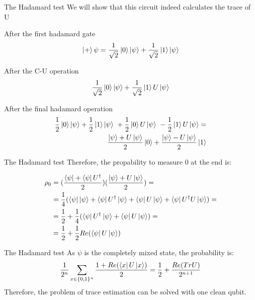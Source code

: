\documentclass[leqno,fleqn]{beamer}
\begin{document}
\begin{frame}[label=sec-1-4]{The Hadamard test}
We will show that this circuit indeed calculates the trace of U
\begin{block}{After the first hadamard gate}
\begin{align*}
   \Ket{+}\psi = \frac{1}{\sqrt{2}}\Ket{0}\Ket{\psi} + \frac{1}{\sqrt{2}}\Ket{1}\Ket{\psi}
\end{align*}
\end{block}
\begin{block}{After the C-U operation}
\begin{align*}
   \frac{1}{\sqrt{2}}\Ket{0}\Ket{\psi} + \frac{1}{\sqrt{2}}\Ket{1}U\Ket{\psi}
\end{align*}
\end{block}
\begin{block}{After the final hadamard operation}
\begin{align*}
   \frac{1}{2}\Ket{0}\Ket{\psi} + \frac{1}{2}\Ket{1}\Ket{\psi}\ +\frac{1}{2}\Ket{0}U\Ket{\psi}\ -  \frac{1}{2}\Ket{1}U\Ket{\psi} = \\
   \frac{\Ket{\psi} + U\Ket{\psi}}{2}\Ket{0} + \frac{\Ket{\psi} - U\Ket{\psi}}{2}\Ket{1}
\end{align*}
\end{block}
\end{frame}

\begin{frame}[label=sec-1-5]{The Hadamard test}
Therefore, the propability to measure 0 at the end is:

\begin{align*}
\rho_{0} &= (\frac{\bra{\psi} + \bra{\psi}U^\dagger}{2})(\frac{\ket{\psi} + U\ket{\psi}}{2}) = \\
    &= \frac{1}{4}(\bra{\psi}\ket{\psi} + \bra{\psi}U^\dagger\ket{\psi} + \bra{\psi}U\ket{\psi} + \bra{\psi}U^\dagger U\ket{\psi}) = \\
    &= \frac{1}{2} + \frac{1}{4}(\bra{\psi}U^\dagger\ket{\psi} + \bra{\psi}U\ket{\psi}) = \\
    &=  \frac{1}{2} + \frac{1}{2}Re(\bra{\psi}U\ket{\psi})
\end{align*}
\end{frame}
\begin{frame}[label=sec-1-6]{The Hadamard test}
As \(\psi\) is the completely mixed state, the probability is: \\
\begin{align*}
  \frac{1}{2^{n}}\sum_{x \in \{0,1\}^n}{\frac{1+Re(\bra{x}U\ket{x})}{2}} = \frac{1}{2} + \frac{Re(TrU)}{2^{n+1}}
\end{align*}
Therefore, the problem of trace estimation can be solved with one clean qubit.
\end{frame}
\end{document}
